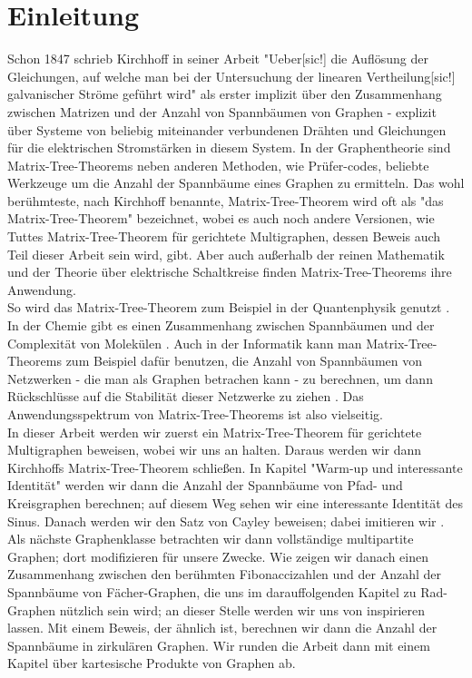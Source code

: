 \section{Einleitung}
Schon 1847 schrieb Kirchhoff in seiner Arbeit "Ueber[sic!] die Auflösung der Gleichungen, auf welche man bei der Untersuchung der linearen Vertheilung[sic!] galvanischer Ströme geführt wird" \cite{kirchhoff_1847} als erster implizit über den Zusammenhang zwischen Matrizen und der Anzahl von Spannbäumen von Graphen - explizit über Systeme von beliebig miteinander verbundenen Drähten und Gleichungen für die elektrischen Stromstärken in diesem System.
In der Graphentheorie sind Matrix-Tree-Theorems neben anderen Methoden, wie Prüfer-codes, beliebte Werkzeuge um die Anzahl der Spannbäume eines Graphen zu ermitteln.
Das wohl berühmteste, nach Kirchhoff benannte, Matrix-Tree-Theorem wird oft als "das Matrix-Tree-Theorem" bezeichnet, wobei es auch noch andere Versionen, wie Tuttes Matrix-Tree-Theorem für gerichtete Multigraphen, dessen Beweis auch Teil dieser Arbeit sein wird, gibt.
Aber auch außerhalb der reinen Mathematik und der Theorie über elektrische Schaltkreise finden Matrix-Tree-Theorems ihre Anwendung.\\
So wird das Matrix-Tree-Theorem zum Beispiel in der Quantenphysik genutzt \cite{giovannetti_severini_2013}.
In der Chemie gibt es einen Zusammenhang zwischen Spannbäumen und der Complexität von Molekülen \cite{janezic_2015}.
Auch in der Informatik kann man Matrix-Tree-Theorems zum Beispiel dafür benutzen, die Anzahl von Spannbäumen von Netzwerken - die man als Graphen betrachen kann - zu berechnen, um dann Rück\-schlüsse auf die Stabilität dieser Netzwerke zu ziehen \cite{yakoubi_2019}.
Das Anwendungsspektrum von Matrix-Tree-Theorems ist also vielseitig.\\
In dieser Arbeit werden wir zuerst ein Matrix-Tree-Theorem für gerichtete Multigraphen beweisen, wobei wir uns an \cite{bang-jensen_2009} halten. Daraus werden wir dann Kirchhoffs Matrix-Tree-Theorem schließen. In Kapitel "Warm-up und interessante Identität" werden wir dann die Anzahl der Spannbäume von Pfad- und Kreisgraphen berechnen; auf diesem Weg sehen wir eine interessante Identität des Sinus. Danach werden wir den Satz von Cayley beweisen; dabei imitieren wir \cite{Lau_2004}.
Als nächste Graphenklasse be\-trachten wir dann vollständige multipartite Graphen; dort modifizieren \cite{austin_1960} für unsere Zwecke. Wie \cite{bogdanowicz_2008} zeigen wir danach einen Zusammenhang zwischen den berühmten Fibonaccizahlen und der Anzahl der Spannbäume von Fächer-Graphen, die uns im darauffolgenden Kapitel zu Rad-Graphen nützlich sein wird; an dieser Stelle werden wir uns von \cite{sedlacek_1970} inspirieren lassen. 
Mit einem Beweis, der \cite{wang_yang_1984} ähnlich ist, berechnen wir dann die Anzahl der Spannbäume in zirkulären Graphen. Wir runden die Arbeit dann mit einem Kapitel über kartesische Produkte von Graphen ab. 

